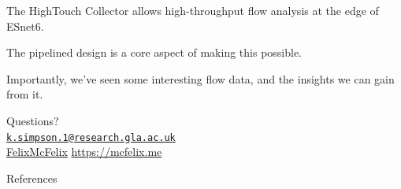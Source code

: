 \documentclass[aspectratio=169,xcolor={dvipsnames}
,notes
,handout
]{beamer}
\begin{document}
\begin{frame}[standout]
	The \alert{HighTouch Collector} allows high-throughput flow analysis at the edge of \alert{ESnet6}. \pause
	
	The \alert{pipelined design} is a core aspect of making this possible. \pause
	
	Importantly, we've seen some \alert{interesting flow data}, and the insights we can gain from it. \pause
	
	Questions?\\
	
	{
		\scriptsize
		\vspace{2em}\faEnvelopeO{} \href{mailto:k.simpson.1@research.gla.ac.uk}{\nolinkurl{k.simpson.1@research.gla.ac.uk}}\\
		\small{\faGithub{} \href{https://github.com/felixmcfelix}{FelixMcFelix} \hspace{0.5em} \faGlobe{} \url{https://mcfelix.me}}
	}
\end{frame}

\appendix

\begin{frame}[allowframebreaks]{References}
	\printbibliography[heading=none]
\end{frame}
\end{document}
